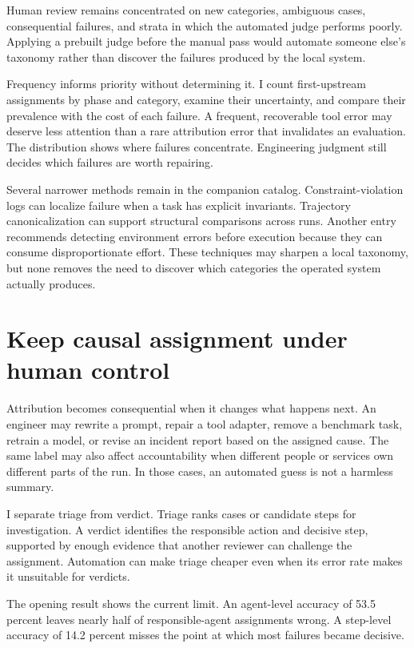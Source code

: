 Human review remains concentrated on new categories, ambiguous cases, consequential failures, and strata in which the automated judge performs poorly. Applying a prebuilt judge before the manual pass would automate someone else's taxonomy rather than discover the failures produced by the local system.

Frequency informs priority without determining it. I count first-upstream assignments by phase and category, examine their uncertainty, and compare their prevalence with the cost of each failure. A frequent, recoverable tool error may deserve less attention than a rare attribution error that invalidates an evaluation. The distribution shows where failures concentrate. Engineering judgment still decides which failures are worth repairing.

Several narrower methods remain in the companion catalog. Constraint-violation logs can localize failure when a task has explicit invariants. Trajectory canonicalization can support structural comparisons across runs. Another entry recommends detecting environment errors before execution because they can consume disproportionate effort. These techniques may sharpen a local taxonomy, but none removes the need to discover which categories the operated system actually produces.

\section{Keep causal assignment under human control}\label{keep-causal-assignment-under-human-control}

Attribution becomes consequential when it changes what happens next. An engineer may rewrite a prompt, repair a tool adapter, remove a benchmark task, retrain a model, or revise an incident report based on the assigned cause. The same label may also affect accountability when different people or services own different parts of the run. In those cases, an automated guess is not a harmless summary.

I separate triage from verdict. Triage ranks cases or candidate steps for investigation. A verdict identifies the responsible action and decisive step, supported by enough evidence that another reviewer can challenge the assignment. Automation can make triage cheaper even when its error rate makes it unsuitable for verdicts.

The opening result shows the current limit. An agent-level accuracy of 53.5 percent leaves nearly half of responsible-agent assignments wrong. A step-level accuracy of 14.2 percent misses the point at which most failures became decisive.

